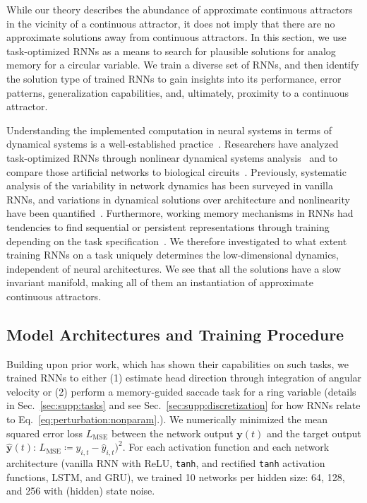 \documentclass{article} %
\newcounter{ct}
\theoremstyle{definition}
\theoremstyle{remark}
\begin{document}
While our theory describes the abundance of approximate continuous attractors in the vicinity of a continuous attractor, it does not imply that there are no approximate solutions away from continuous attractors.
In this section, we use task-optimized RNNs as a means to search for plausible solutions for analog memory for a circular variable.
We train a diverse set of RNNs, and then identify the solution type of trained RNNs to gain insights into its performance, error patterns, generalization capabilities, and, ultimately, proximity to a continuous attractor.

Understanding the implemented computation in neural systems in terms of dynamical systems is a well-established practice~\citep{seung1996,sompolinsky1988,vyas2020}.
Researchers have analyzed task-optimized RNNs through nonlinear dynamical systems analysis~\citep{sussillo2013blackbox,sussillo2014,barak2013,driscoll2022,maheswaranathan2019universality,cueva2019headdirection,cueva2021continuous} and to compare those artificial networks to biological circuits~\citep{mante2013context,remington2018flexible,ghazizadeh2021slow}.
Previously, systematic analysis of the variability in network dynamics has been surveyed in vanilla RNNs, and variations in dynamical solutions over architecture and nonlinearity have been quantified~\citep{sussillo2013blackbox,mante2013context,yang2019task,maheswaranathan2019universality,driscoll2022}.
Furthermore, working memory mechanisms in RNNs had tendencies to find sequential or persistent representations through training depending on the task specification~\citep{orhan2019diverse}.
We therefore investigated to what extent training RNNs on a task uniquely determines the low-dimensional dynamics, independent of neural architectures.
We see that all the solutions have a slow invariant manifold, making all of them an instantiation of approximate continuous attractors.

\subsection{Model Architectures and Training Procedure}
Building upon prior work, which has shown their capabilities on such tasks, we trained RNNs to either
(1) estimate head direction through integration of angular velocity \citep{cueva2019headdirection,cueva2021continuous}
or (2) perform a memory-guided saccade task for a ring variable \citep{wimmer2014,xie2022neural} (details in Sec.~\ref{sec:supp:tasks} and see Sec.~\ref{sec:supp:discretization} for how RNNs relate to Eq.~\ref{eq:perturbation:nonparam}.).
We numerically minimized the mean squared error loss \(L_{\operatorname{MSE}}\)  between the network output \(\mathbf{y}(t)\) and the target output \(\hat{\mathbf{y}}(t)\):
\(L_{\operatorname{MSE}} \coloneqq y_{i, t}-\hat y_{i, t})^{2}\).
For each activation function and each network architecture (vanilla RNN with ReLU, \texttt{tanh}, and rectified \texttt{tanh} activation functions, LSTM, and GRU), we trained 10 networks per hidden size: 64, 128, and 256 with (hidden) state noise.
\end{document}
